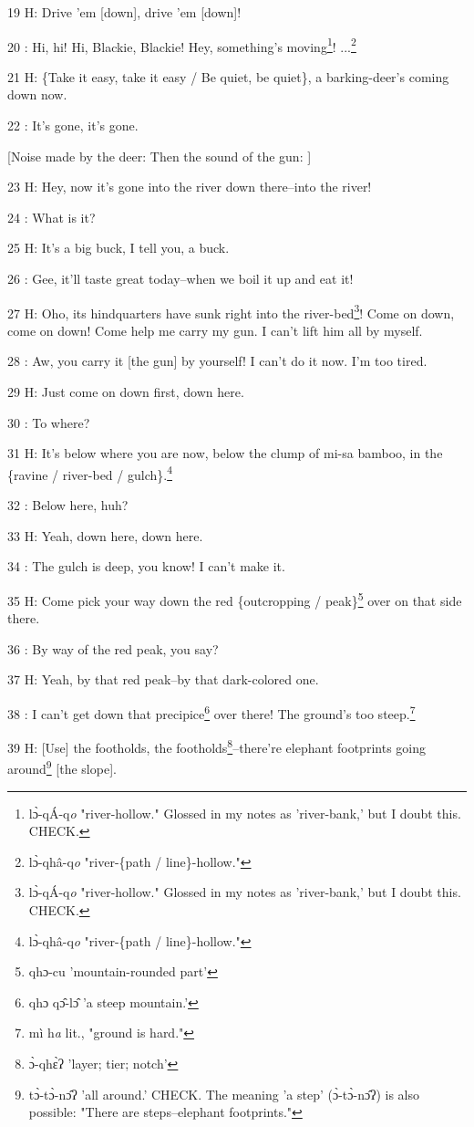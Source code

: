 19 H: Drive 'em [down], drive 'em [down]!

20  : Hi, hi! Hi, Blackie, Blackie! Hey, something's moving\footnote{lɔ̀-qÁ-q\emph{o} "river-hollow." Glossed in my notes as 'river-bank,' but I doubt this. CHECK.}! ...\footnote{lɔ̀-qhâ-q\emph{o} "river-\{path / line\}-hollow."}

21 H: \{Take it easy, take it easy / Be quiet, be quiet\}, a barking-deer's coming
down now.

22  : It's gone, it's gone.

[Noise made by the deer: Then the sound of the gun: ]

23 H: Hey, now it's gone into the river down there--into the river!

24  : What is it?

25 H: It's a big buck, I tell you, a buck.

26  : Gee, it'll taste great today--when we boil it up and eat it!

27 H: Oho, its hindquarters have sunk right into the river-bed\footnote{lɔ̀-qÁ-q\emph{o} "river-hollow." Glossed in my notes as 'river-bank,' but I doubt this. CHECK.}! Come on down,
come on down! Come help me carry my gun. I can't lift him all by myself.

28  : Aw, you carry it [the gun] by yourself! I can't do it now. I'm too tired.

29 H: Just come on down first, down here.

30  : To where?

31 H: It's below where you are now, below the clump of mi-sa bamboo, in the \{ravine
/ river-bed / gulch\}.\footnote{lɔ̀-qhâ-q\emph{o} "river-\{path / line\}-hollow."}

32  : Below here, huh?

33 H: Yeah, down here, down here.

34  : The gulch is deep, you know! I can't make it.

35 H: Come pick your way down the red \{outcropping / peak\}\footnote{qhɔ-cu 'mountain-rounded part'} over on that side
there.

36  : By way of the red peak, you say?

37 H: Yeah, by that red peak--by that dark-colored one.

38  : I can't get down that precipice\footnote{qhɔ qɔ̂-lɔ̂ 'a steep mountain.'} over there! The ground's too steep.\footnote{mì h\emph{a} lit., "ground is hard."}

39 H: [Use] the footholds, the footholds\footnote{ɔ̀-qhɛ̀ʔ 'layer; tier; notch'}--there're elephant footprints going
around\footnote{tɔ̀-tɔ̀-nɔ̂ʔ 'all around.' CHECK. The meaning 'a step' (ɔ̀-tɔ̀-nɔ̂ʔ) is also possible: "There are steps--elephant footprints."} [the slope].

